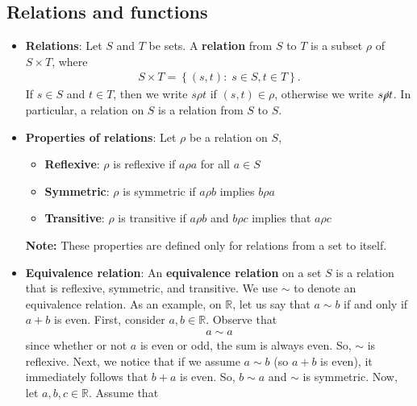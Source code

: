 \documentclass{report}
\begin{document}
    \pagebreak 
    \subsection{Relations and functions}
    \begin{itemize}
        \item \textbf{Relations}: Let $S$ and $T$ be sets. A \textbf{relation} from $S$ to $T$ is a subset $\rho$ of $S \times T$, where
            \begin{align*}
                S\times T = \left\{(s,t):\; s \in S, t \in T\right\}
            .\end{align*}
            If $s \in S$ and $t \in T$, then we write $s\rho t$ if $(s,t) \in \rho$, otherwise we write $s \cancel{\rho} t$. In particular, a relation on $S$ is a relation from $S$ to $S$.
        \item \textbf{Properties of relations}: Let $\rho$ be a relation on $S$,
            \begin{itemize}
                \item \textbf{Reflexive}: $\rho$ is reflexive if $a \rho a$ for all $a \in S$
                \item \textbf{Symmetric}: $\rho$ is symmetric if $a\rho b$ implies $b \rho a$
                \item \textbf{Transitive}: $\rho$ is transitive if $a \rho b$ and $b \rho c$ implies that $a \rho c$
            \end{itemize}
            \textbf{Note:} These properties are defined only for relations from a set to itself.
        \item \textbf{Equivalence relation}: An \textbf{equivalence relation} on a set $S$ is a relation that is reflexive, symmetric, and transitive. We use $\sim$ to denote an equivalence relation.
            \bigbreak \noindent 
            As an example, on $\mathbb{R}$, let us say that $a \sim b$ if and only if $a+b$ is even. First, consider $a,b \in \mathbb{R}$. Observe that
            \begin{align*}
                a \sim a
            \end{align*}
            since whether or not $a$ is even or odd, the sum is always even. So, $\sim$ is reflexive. Next, we notice that if we assume $a\sim b$ (so $a+b$ is even), it immediately follows that $b+a$ is even. So, $b\sim a$ and $\sim$ is symmetric.
            \bigbreak \noindent 
            Now, let $a,b,c \in \mathbb{R}$. Assume that
            \begin{align*}

\end{align*}
\end{itemize}
\end{document}
